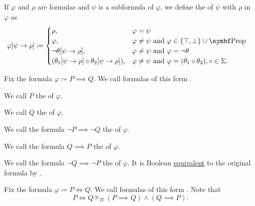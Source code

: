 \begin{definition}\label{def:propositional_substition}
  If \( \varphi \) and \( \rho \) are formulas and \( \psi \) is a subformula of \( \varphi \), we define the  of \( \psi \) with \( \rho \) in \( \varphi \) as
  \begin{align*}
    \varphi[\psi \to \rho] &\coloneqq \begin{cases}
      \rho,                                                    &\varphi = \psi \\
      \varphi,                                                 &\varphi \neq \psi \text{ and } \varphi \in \{ \top, \bot \} \cup \Bold{Prop} \\
      \neg \theta[\psi \to \rho],                              &\varphi \neq \psi \text{ and } \varphi = \neg \theta \\
      (\theta_1[\psi \to \rho] \circ \theta_2[\psi \to \rho]), &\varphi \neq \psi \text{ and } \varphi = (\theta_1 \circ \theta_2), \circ \in \Sigma.
    \end{cases}
  \end{align*}

\begin{definition}\label{def:material_implication}
  Fix the formula \( \varphi \coloneqq P \implies Q \). We call formulas of this form .

  \begin{defenum}
     We call \( P \) the  of \( \varphi \).

     We call \( Q \) the  of \( \varphi \).

     We call the formula \( \neg P \implies \neg Q \) the  of \( \varphi \).

     We call the formula \( Q \implies P \) the  of \( \varphi \).

     We call the formula \( \neg Q \implies \neg P \) the  of \( \varphi \). It is Boolean \hyperref[def:propositional_interpretation]{equivalent} to the original formula by .
  \end{defenum}
\end{definition}

\begin{definition}\label{def:equivalence}
  Fix the formula \( \varphi \coloneqq P \iff Q \). We call formulas of this form . Note that
  \begin{equation*}
    P \iff Q \models_B (P \implies Q) \wedge (Q \implies P).
  \end{equation*}


\end{definition}
\end{definition}
